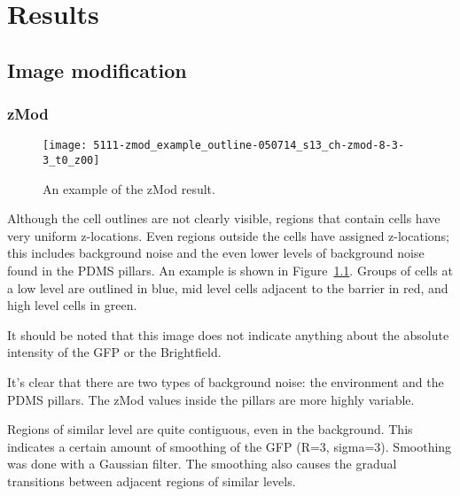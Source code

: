 
\chapter{Results}

\ifpdf
    \graphicspath{{Chapter6/Figs/Raster/}{Chapter6/Figs/PDF/}{Chapter6/Figs/}}
\else
    \graphicspath{{Chapter6/Figs/Vector/}{Chapter6/Figs/}}
\fi

\section{Image modification}

\subsection{zMod}

\begin{figure}[htbp!]
\centering
\texttt{[image: 5111-zmod\_example\_outline-050714\_s13\_ch-zmod-8-3-3\_t0\_z00]}
\caption[zMod example]{An example of the zMod result.}
\label{fig:zmod_result}
\end{figure}

Although the cell outlines are not clearly visible, regions that contain cells have very uniform z-locations. Even regions outside the cells have assigned z-locations; this includes background noise and the even lower levels of background noise found in the PDMS pillars. An example is shown in Figure~\ref{fig:zmod_result}. Groups of cells at a low level are outlined in blue, mid level cells adjacent to the barrier in red, and high level cells in green.

It should be noted that this image does not indicate anything about the absolute intensity of the GFP or the Brightfield.

It's clear that there are two types of background noise: the environment and the PDMS pillars. The zMod values inside the pillars are more highly variable.

Regions of similar level are quite contiguous, even in the background. This indicates a certain amount of smoothing of the GFP (R=3, sigma=3). Smoothing was done with a Gaussian filter. The smoothing also causes the gradual transitions between adjacent regions of similar levels.

